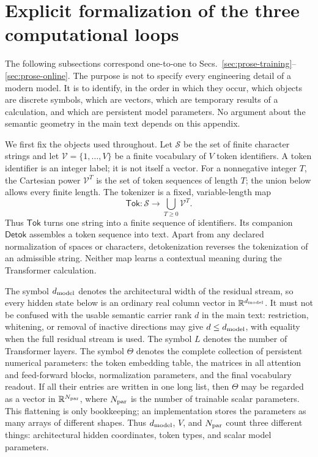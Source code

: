 \documentclass[
  aps,
  reprint,
  superscriptaddress,
  floatfix,
  nofootinbib,
  longbibliography
]{revtex4-2}
\newcommand{\R}{\mathbb{R}}
\begin{document}
\appendix

\section{Explicit formalization of the three computational loops}
\label{app:llm-loops}

The following subsections correspond one-to-one to
Secs.~\ref{sec:prose-training}--\ref{sec:prose-online}.  The purpose is not to
specify every engineering detail of a modern model.  It is to identify, in the
order in which they occur, which objects are discrete symbols, which are
vectors, which are temporary results of a calculation, and which are persistent
model parameters.  No argument about the semantic geometry in the main text
depends on this appendix.

We first fix the objects used throughout.  Let $\mathcal S$ be the set of
finite character strings and let $\mathcal V=\{1,\ldots,V\}$ be a finite
vocabulary of $V$ token identifiers.  A token identifier is an integer label;
it is not itself a vector.  For a nonnegative integer $T$, the Cartesian power
$\mathcal V^T$ is the set of token sequences of length $T$; the union below
allows every finite length.  The tokenizer is a fixed, variable-length map
\begin{equation}
\label{eq:app-tokenizer}
\mathsf{Tok}:\mathcal S\longrightarrow
\bigcup_{T\geq0}\mathcal V^T.
\end{equation}
Thus $\mathsf{Tok}$ turns one string into a finite sequence of identifiers.  Its
companion $\mathsf{Detok}$ assembles a token sequence into text.  Apart from any
declared normalization of spaces or characters, detokenization reverses the
tokenization of an admissible string.  Neither map learns a contextual meaning
during the Transformer calculation.

The symbol $d_{\rm model}$ denotes the architectural width of the residual
stream, so every hidden state below is an ordinary real column vector in
$\R^{d_{\rm model}}$.  It must not be confused with the usable semantic carrier
rank $d$ in the main text: restriction, whitening, or removal of inactive
directions may give $d\leq d_{\rm model}$, with equality when the full residual
stream is used.  The symbol $L$ denotes the number of Transformer layers.  The
symbol $\Theta$ denotes the complete
collection of persistent numerical parameters: the token embedding table, the
matrices in all attention and feed-forward blocks, normalization parameters,
and the final vocabulary readout.  If all their entries are written in one long
list, then $\Theta$ may be regarded as a vector in $\R^{N_{\rm par}}$, where
$N_{\rm par}$ is the number of trainable scalar parameters.  This flattening is
only bookkeeping; an implementation stores the parameters as many arrays of
different shapes.  Thus $d_{\rm model}$, $V$, and $N_{\rm par}$ count three
different things: architectural hidden coordinates, token types, and scalar
model parameters.
\end{document}
